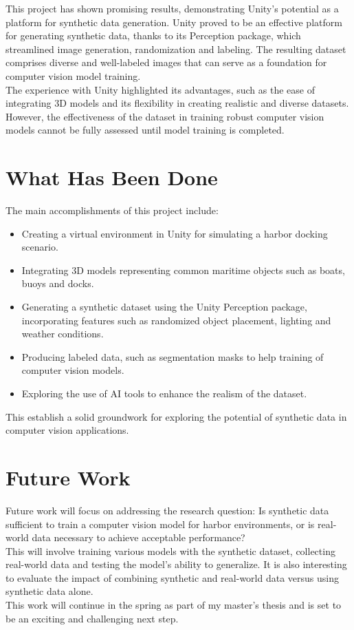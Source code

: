 
This project has shown promising results, demonstrating Unity's potential as a platform for synthetic data generation. Unity proved to be an effective platform for generating synthetic data, thanks to its Perception package, which streamlined image generation, randomization and labeling. The resulting dataset comprises diverse and well-labeled images that can serve as a foundation for computer vision model training.\\

\noindent The experience with Unity highlighted its advantages, such as the ease of integrating 3D models and its flexibility in creating realistic and diverse datasets. However, the effectiveness of the dataset in training robust computer vision models cannot be fully assessed until model training is completed.


\section{What Has Been Done}
The main accomplishments of this project include: 
\begin{itemize} 
\item Creating a virtual environment in Unity for simulating a harbor docking scenario. 
\item Integrating 3D models representing common maritime objects such as boats, buoys and docks. 
\item Generating a synthetic dataset using the Unity Perception package, incorporating features such as randomized object placement, lighting and weather conditions. 
\item Producing labeled data, such as segmentation masks to help training of computer vision models. 
\item Exploring the use of AI tools to enhance the realism of the dataset. 
\end{itemize}
  
\noindent This establish a solid groundwork for exploring the potential of synthetic data in computer vision applications.

\section{Future Work}
Future work will focus on addressing the research question: Is synthetic data sufficient to train a computer vision model for harbor environments, or is real-world data necessary to achieve acceptable performance?\\

\noindent This will involve training various models with the synthetic dataset, collecting real-world data and testing the model's ability to generalize. It is also interesting to evaluate the impact of combining synthetic and real-world data versus using synthetic data alone.\\

\noindent This work will continue in the spring as part of my master's thesis and is set to be an exciting and challenging next step.
